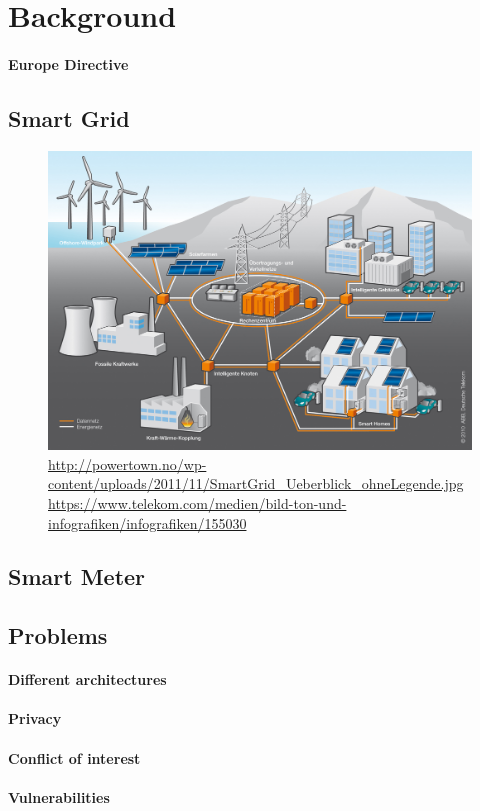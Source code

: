 \section{Background}

\paragraph{Europe Directive}

\subsection{Smart Grid}

\begin{figure}
	\includegraphics[width=\textwidth]{figures/SmartGrid_Ueberblick_ohneLegende.jpg}
	\caption{\url{http://powertown.no/wp-content/uploads/2011/11/SmartGrid_Ueberblick_ohneLegende.jpg} \url{https://www.telekom.com/medien/bild-ton-und-infografiken/infografiken/155030}}
	\label{fig:background:smartgrid}
\end{figure}

\subsection{Smart Meter}

\subsection{Problems}

\paragraph{Different architectures}

\paragraph{Privacy}

\paragraph{Conflict of interest}

\paragraph{Vulnerabilities}
